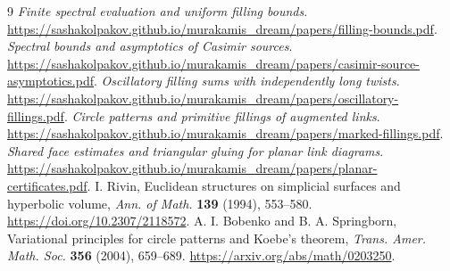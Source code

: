 \documentclass[11pt]{article}
\numberwithin{equation}{section}
\theoremstyle{definition}\newtheorem{definition}[theorem]{Definition}
\theoremstyle{remark}\newtheorem{remark}[theorem]{Remark}
\begin{document}
\begin{thebibliography}{9}
\emph{Finite spectral evaluation and uniform filling bounds}.
\url{https://sashakolpakov.github.io/murakamis_dream/papers/filling-bounds.pdf}.
 \emph{Spectral bounds and asymptotics of Casimir sources}.
\url{https://sashakolpakov.github.io/murakamis_dream/papers/casimir-source-asymptotics.pdf}.
\emph{Oscillatory filling sums with independently long twists}.
\url{https://sashakolpakov.github.io/murakamis_dream/papers/oscillatory-fillings.pdf}.
\emph{Circle patterns and primitive fillings of augmented links}.
\url{https://sashakolpakov.github.io/murakamis_dream/papers/marked-fillings.pdf}.
\emph{Shared face estimates and triangular gluing for planar link diagrams}.
\url{https://sashakolpakov.github.io/murakamis_dream/papers/planar-certificates.pdf}.
I. Rivin, Euclidean structures on simplicial surfaces and hyperbolic
volume, \emph{Ann. of Math.} \textbf{139} (1994), 553--580.
\url{https://doi.org/10.2307/2118572}.
A. I. Bobenko and B. A. Springborn, Variational principles for circle
patterns and Koebe's theorem, \emph{Trans. Amer. Math. Soc.}
\textbf{356} (2004), 659--689.
\url{https://arxiv.org/abs/math/0203250}.
\end{thebibliography}
\end{document}
